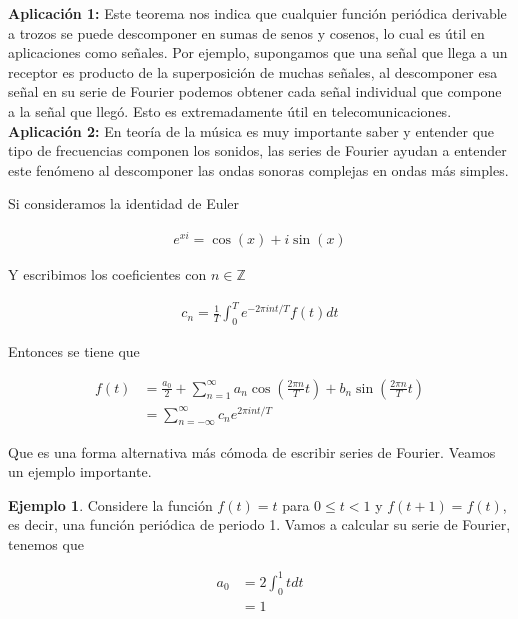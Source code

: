 \documentclass{article}
\theoremstyle{plain}
\theoremstyle{definition}
\newtheorem{ejem}[thm]{Ejemplo}
\begin{document}
\textbf{Aplicación 1:} Este teorema nos indica que cualquier función periódica derivable a trozos se puede descomponer en sumas de senos y cosenos, lo cual es  útil en aplicaciones como señales. Por ejemplo, supongamos que una señal que llega a un receptor es producto de la superposición de muchas señales, al descomponer esa señal en su serie de Fourier podemos obtener cada señal individual que compone a la señal que llegó. Esto es extremadamente útil en telecomunicaciones. \\

\textbf{Aplicación 2:} En teoría de la música es muy importante saber y entender que tipo de frecuencias componen los sonidos, las series de Fourier ayudan a entender este fenómeno al descomponer las ondas sonoras complejas en ondas más simples.  \\

\newpage

Si consideramos la identidad de Euler

\begin{align*}
    e^{xi} = \cos(x)+i\sin(x)
\end{align*}

Y escribimos los coeficientes con $n\in \mathbb{Z}$

\begin{align*}
    c_n = \frac{1}{T} \int_0^T e^{-2\pi i n t/T} f(t) dt
\end{align*}

Entonces se tiene que

\begin{align*}
    f(t) &= \frac{a_0}{2}+ \sum_{n=1}^\infty a_n\cos \left( \frac{2\pi n}{T} t  \right) +b_n\sin \left( \frac{2\pi n}{T} t  \right) \\
    &=\sum_{n=-\infty}^{\infty} c_n e^{2\pi i n t/T}
\end{align*}

Que es una forma alternativa más cómoda de escribir series de Fourier. Veamos un ejemplo importante. \\

\begin{ejem}Considere la función $f(t) = t$ para $0\leq t < 1$ y $f(t+1)=f(t)$, es decir, una función periódica de periodo 1. Vamos a calcular su serie de Fourier, tenemos que
\end{ejem}

\begin{align*}
    a_0 &= 2 \int_0^1 t dt \\
     &= 1
\end{align*}
\end{document}
